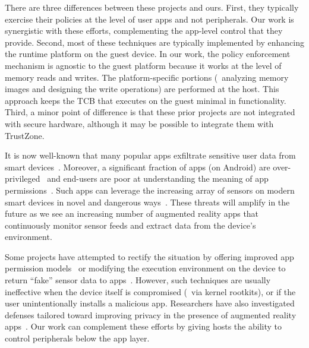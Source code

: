There are three differences between these projects and ours. First, they
typically exercise their policies at the level of user apps and not
peripherals.  Our work is synergistic with these efforts, complementing the
app-level control that they provide. Second, most of these techniques are
typically implemented by enhancing the runtime platform on the guest device. In
our work, the policy enforcement mechanism is agnostic to the guest platform
because it works at the level of memory reads and writes. The platform-specific
portions (\ie~analyzing memory images and designing the write operations) are
performed at the host.  This approach keeps the TCB that executes on the guest
minimal in functionality.  Third, a minor point of difference is that these
prior projects are not integrated with secure hardware, although it may be
possible to integrate them with TrustZone.

%
It is now well-known that many popular apps exfiltrate sensitive user data from
smart devices~\cite{taintdroid:osdi10}. Moreover, a significant fraction of
apps (on Android) are over-privileged~\cite{stowaway:ccs11,pscout:ccs12} and
end-users are poor at understanding the meaning of app
permissions~\cite{ep:ubicomp12,felt:soups12}.  Such apps can leverage the
increasing array of sensors on modern smart devices in novel and dangerous
ways~\cite{soundcomber:ndss11,placeraider:ndss13}. These threats will amplify
in the future as we see an increasing number of augmented reality apps that
continuously monitor sensor feeds and extract data from the device's
environment.

Some projects have attempted to rectify the situation by offering improved app
permission models~\cite{howtoask:hotsec12} or modifying the execution
environment on the device to return ``fake'' sensor data to
apps~\cite{mockdroid:hotmobile10}. However, such techniques are usually
ineffective when the device itself is compromised (\eg~via kernel rootkits), or
if the user unintentionally installs a malicious app. Researchers have also
investigated defenses tailored toward improving privacy in the presence of
augmented reality apps~\cite{ar:sec13,darkly:oak13}. Our work can complement
these efforts by giving hosts the ability to control peripherals below the app
layer. 

